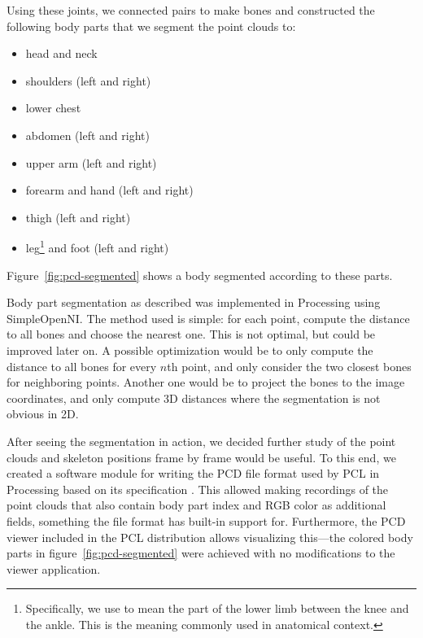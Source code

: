 Using these joints, we connected pairs to make bones and constructed the following body parts that we segment the point clouds to:
%
\begin{itemize}
    \item head and neck
    \item shoulders (left and right)
    \item lower chest
    \item abdomen (left and right)
    \item upper arm (left and right)
    \item forearm and hand (left and right)
    \item thigh (left and right)
    \item leg\footnote{Specifically, we use  to mean the part of the lower limb between the knee and the ankle. This is the meaning commonly used in anatomical context.} and foot (left and right)
\end{itemize}
%
Figure~\ref{fig:pcd-segmented} shows a body segmented according to these parts.

Body part segmentation as described was implemented in Processing using SimpleOpenNI. The method used is simple: for each point, compute the distance to all bones and choose the nearest one. This is not optimal, but could be improved later on. A possible optimization would be to only compute the distance to all bones for every $n$th point, and only consider the two closest bones for neighboring points. Another one would be to project the bones to the image coordinates, and only compute 3D distances where the segmentation is not obvious in 2D.

After seeing the segmentation in action, we decided further study of the point clouds and skeleton positions frame by frame would be useful. To this end, we created a software module for writing the PCD file format used by PCL in Processing based on its specification \citep{pcdspec}. This allowed making recordings of the point clouds that also contain body part index and RGB color as additional fields, something the file format has built-in support for. Furthermore, the PCD viewer included in the PCL distribution allows visualizing this---the colored body parts in figure~\ref{fig:pcd-segmented} were achieved with no modifications to the viewer application.

